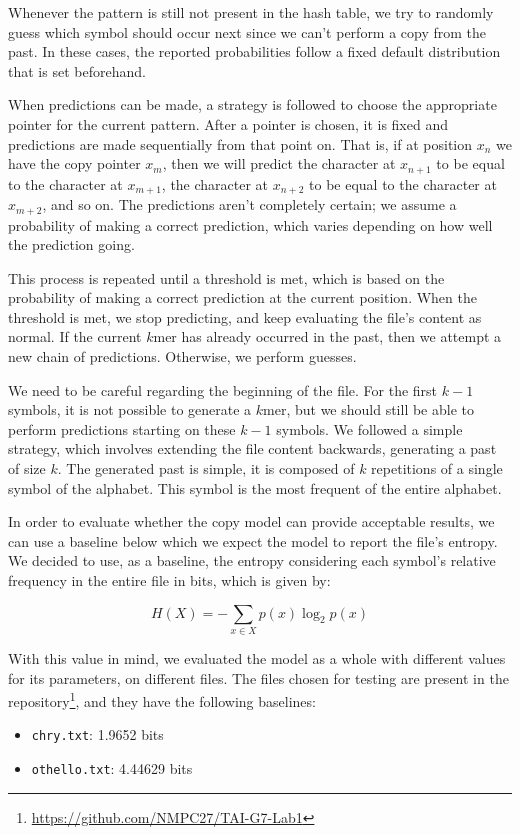 \documentclass{article}
\begin{document}
Whenever the pattern is still not present in the hash table, we try to randomly guess which symbol should occur next since we can't perform a copy from the past.
In these cases, the reported probabilities follow a fixed default distribution that is set beforehand.

When predictions can be made, a strategy is followed to choose the appropriate pointer for the current pattern.
After a pointer is chosen, it is fixed and predictions are made sequentially from that point on.
That is, if at position $x_n$ we have the copy pointer $x_m$, then we will predict the character at $x_{n+1}$ to be equal to the character at $x_{m+1}$, the character at $x_{n+2}$ to be equal to the character at $x_{m+2}$, and so on.
The predictions aren't completely certain; we assume a probability of making a correct prediction, which varies depending on how well the prediction going.

This process is repeated until a threshold is met, which is based on the probability of making a correct prediction at the current position.
When the threshold is met, we stop predicting, and keep evaluating the file's content as normal.
If the current $k$mer has already occurred in the past, then we attempt a new chain of predictions.
Otherwise, we perform guesses.

We need to be careful regarding the beginning of the file.
For the first $k-1$ symbols, it is not possible to generate a $k$mer, but we should still be able to perform predictions starting on these $k-1$ symbols.
We followed a simple strategy, which involves extending the file content backwards, generating a past of size $k$.
The generated past is simple, it is composed of $k$ repetitions of a single symbol of the alphabet.
This symbol is the most frequent of the entire alphabet.

In order to evaluate whether the copy model can provide acceptable results, we can use a baseline below which we expect the model to report the file's entropy.
We decided to use, as a baseline, the entropy considering each symbol's relative frequency in the entire file in bits, which is given by:

$$
H(X) = - \sum_{x \in X}{p(x) \log_{2}{p(x)}}
$$

With this value in mind, we evaluated the model as a whole with different values for its parameters, on different files.
The files chosen for testing are present in the repository\footnote{\url{https://github.com/NMPC27/TAI-G7-Lab1}}, and they have the following baselines:
\begin{itemize}
    \item \verb|chry.txt|: 1.9652 bits
    \item \verb|othello.txt|: 4.44629 bits
\end{itemize}
\end{document}
